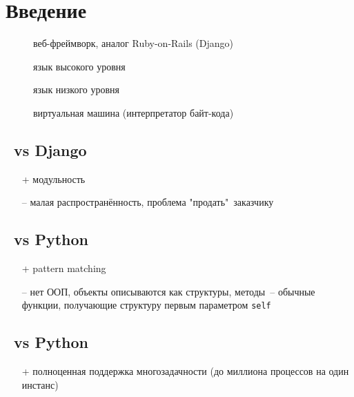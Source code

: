 \section{Введение}


\begin{description}
    \item[\phx] веб-фреймворк, аналог Ruby-on-Rails (Django)
    \item[\ex] язык высокого уровня
    \item[\erl] язык низкого уровня
    \item[\beam] виртуальная машина (интерпретатор байт-кода) 
\end{description}

\subsection{\phx\ vs Django}

\begin{itemize}
    \item[+] модульность
    \item[--] малая распространённость, проблема "продать"\ заказчику
\end{itemize}

\subsection{\ex\ vs Python}

\begin{itemize}
    \item[+] pattern matching
    \item[--] нет ООП, объекты описываются как структуры, методы\ -- обычные
    функции, получающие структуру первым параметром \verb|self|
\end{itemize}

\subsection{\erl\ vs Python}

\begin{itemize}
    \item[+] полноценная поддержка многозадачности (до миллиона процессов на
    один инстанс)
\end{itemize}
